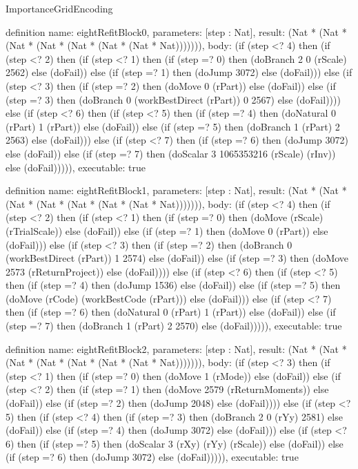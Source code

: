 \begin{lexlean}{ImportanceGridEncoding}
\begin{semanticmodule}
definition{
  name: eightRefitBlock0,
  parameters: [step : Nat],
  result: (Nat * (Nat * (Nat * (Nat * (Nat * (Nat * (Nat * Nat))))))),
  body: (if (step <? 4) then
      (if (step <? 2) then
      (if (step <? 1) then
      (if (step =? 0) then (doBranch 2 0 (rScale) 2562) else (doFail)) else
      (if (step =? 1) then (doJump 3072) else (doFail))) else
      (if (step <? 3) then
      (if (step =? 2) then (doMove 0 (rPart)) else (doFail)) else
      (if (step =? 3) then (doBranch 0 (workBestDirect (rPart)) 0 2567) else (doFail)))) else
      (if (step <? 6) then
      (if (step <? 5) then
      (if (step =? 4) then (doNatural 0 (rPart) 1 (rPart)) else (doFail)) else
      (if (step =? 5) then (doBranch 1 (rPart) 2 2563) else (doFail))) else
      (if (step <? 7) then
      (if (step =? 6) then (doJump 3072) else (doFail)) else
      (if (step =? 7) then (doScalar 3 1065353216 (rScale) (rInv)) else (doFail))))),
  executable: true
}

definition{
  name: eightRefitBlock1,
  parameters: [step : Nat],
  result: (Nat * (Nat * (Nat * (Nat * (Nat * (Nat * (Nat * Nat))))))),
  body: (if (step <? 4) then
      (if (step <? 2) then
      (if (step <? 1) then
      (if (step =? 0) then (doMove (rScale) (rTrialScale)) else (doFail)) else
      (if (step =? 1) then (doMove 0 (rPart)) else (doFail))) else
      (if (step <? 3) then
      (if (step =? 2) then (doBranch 0 (workBestDirect (rPart)) 1 2574) else (doFail)) else
      (if (step =? 3) then (doMove 2573 (rReturnProject)) else (doFail)))) else
      (if (step <? 6) then
      (if (step <? 5) then
      (if (step =? 4) then (doJump 1536) else (doFail)) else
      (if (step =? 5) then (doMove (rCode) (workBestCode (rPart))) else (doFail))) else
      (if (step <? 7) then
      (if (step =? 6) then (doNatural 0 (rPart) 1 (rPart)) else (doFail)) else
      (if (step =? 7) then (doBranch 1 (rPart) 2 2570) else (doFail))))),
  executable: true
}

definition{
  name: eightRefitBlock2,
  parameters: [step : Nat],
  result: (Nat * (Nat * (Nat * (Nat * (Nat * (Nat * (Nat * Nat))))))),
  body: (if (step <? 3) then
      (if (step <? 1) then
      (if (step =? 0) then (doMove 1 (rMode)) else (doFail)) else
      (if (step <? 2) then
      (if (step =? 1) then (doMove 2579 (rReturnMoments)) else (doFail)) else
      (if (step =? 2) then (doJump 2048) else (doFail)))) else
      (if (step <? 5) then
      (if (step <? 4) then
      (if (step =? 3) then (doBranch 2 0 (rYy) 2581) else (doFail)) else
      (if (step =? 4) then (doJump 3072) else (doFail))) else
      (if (step <? 6) then
      (if (step =? 5) then (doScalar 3 (rXy) (rYy) (rScale)) else (doFail)) else
      (if (step =? 6) then (doJump 3072) else (doFail))))),
  executable: true
}


\end{semanticmodule}
\end{lexlean}
